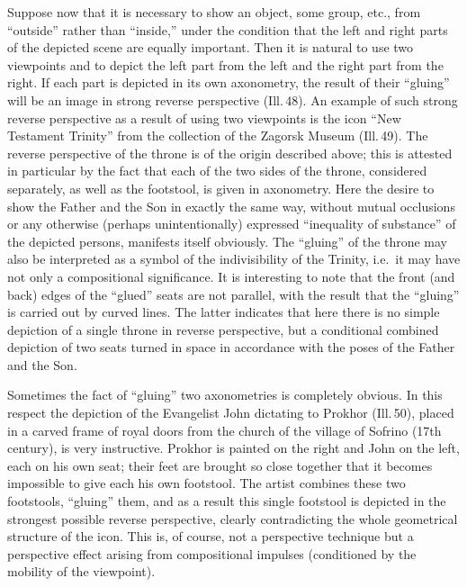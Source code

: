 
Suppose now that it is necessary to show an object, some group, etc., from
``outside'' rather than ``inside,'' under the condition that the left and right parts
of the depicted scene are equally important.  Then it is natural to use two viewpoints
and to depict the left part from the left and the right part from the right.  If each
part is depicted in its own axonometry, the result of their ``gluing'' will be an
image in strong reverse perspective (Ill.\,48).  An example of such strong reverse
perspective as a result of using two viewpoints is the icon ``New Testament Trinity''
from the collection of the Zagorsk Museum (Ill.\,49).  The reverse perspective of the
throne is of the origin described above; this is attested in particular by the fact
that each of the two sides of the throne, considered separately, as well as the
footstool, is given in axonometry.  Here the desire to show the Father and the Son in
exactly the same way, without mutual occlusions or any otherwise (perhaps
unintentionally) expressed ``inequality of substance'' of the depicted persons,
manifests itself obviously.  The ``gluing'' of the throne may also be interpreted as
a symbol of the indivisibility of the Trinity, i.e.\ it may have not only a
compositional significance.  It is interesting to note that the front (and back)
edges of the ``glued'' seats are not parallel, with the result that the ``gluing'' is
carried out by curved lines.  The latter indicates that here there is no simple
depiction of a single throne in reverse perspective, but a conditional combined
depiction of two seats turned in space in accordance with the poses of the Father and
the Son.





Sometimes the fact of ``gluing'' two axonometries is completely obvious.  In this
respect the depiction of the Evangelist John dictating to Prokhor (Ill.\,50), placed
in a carved frame of royal doors from the church of the village of Sofrino (17th
century), is very instructive.  Prokhor is painted on the right and John on the left,
each on his own seat; their feet are brought so close together that it becomes
impossible to give each his own footstool.  The artist combines these two footstools,
``gluing'' them, and as a result this single footstool is depicted in the strongest
possible reverse perspective, clearly contradicting the whole geometrical structure of
the icon.  This is, of course, not a perspective technique but a perspective effect
arising from compositional impulses (conditioned by the mobility of the viewpoint).

